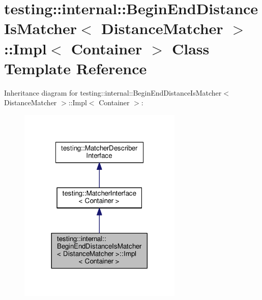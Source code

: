 \hypertarget{classtesting_1_1internal_1_1BeginEndDistanceIsMatcher_1_1Impl}{}\section{testing\+:\+:internal\+:\+:Begin\+End\+Distance\+Is\+Matcher$<$ Distance\+Matcher $>$\+:\+:Impl$<$ Container $>$ Class Template Reference}
\label{classtesting_1_1internal_1_1BeginEndDistanceIsMatcher_1_1Impl}


Inheritance diagram for testing\+:\+:internal\+:\+:Begin\+End\+Distance\+Is\+Matcher$<$ Distance\+Matcher $>$\+:\+:Impl$<$ Container $>$\+:\nopagebreak
\begin{figure}[H]
\begin{center}
\leavevmode
\includegraphics[width=221pt]{classtesting_1_1internal_1_1BeginEndDistanceIsMatcher_1_1Impl__inherit__graph}
\end{center}
\end{figure}


